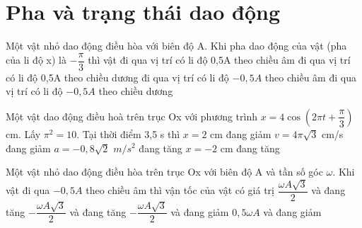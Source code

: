 \section{Pha và trạng thái dao động}
\begin{ex}%
Một vật nhỏ dao động điều hòa với biên độ A. Khi pha dao động của vật (pha của li độ x) là  $-\dfrac{\pi}{3}$  thì vật
\choice
{đi qua vị trí có li độ 0,5A theo chiều âm}
{\True đi qua vị trí có li độ 0,5A theo chiều dương}
{đi qua vị trí có li độ $- 0,5A$ theo chiều âm}
{đi qua vị trí có li độ $- 0,5A$ theo chiều dương}
\end{ex} 
\begin{ex}%
Một vật dao động điều hoà trên trục Ox với phương trình  $x=4\cos \left( 2\pi t+\dfrac{\pi}{3} \right)$ cm. Lấy  $\pi ^2  = 10$. Tại thời điểm 3,5 s thì
\choice
{$x = 2$ cm đang giảm}
{$v =  4\pi \sqrt{3}$ cm/s đang giảm}
{$a =  -0,8\sqrt{2}$  $m/s^2$ đang tăng}
{\True $x = - 2$ cm đang tăng}
\end{ex} 
\begin{ex}%
Một vật nhỏ dao động điều hòa trên trục Ox với biên độ A và tần số góc $\omega$. Khi vật đi qua $-0,5A$ theo chiều âm thì vận tốc của vật có giá trị
\choice
{$\dfrac{\omega A\sqrt{3}}{2}$ và đang tăng}
{\True $-\dfrac{\omega A\sqrt{3}}{2}$  và đang tăng}
{$-\dfrac{\omega A\sqrt{3}}{2}$  và đang giảm}
{$0,5\omega A$ và đang giảm}
\end{ex} 
